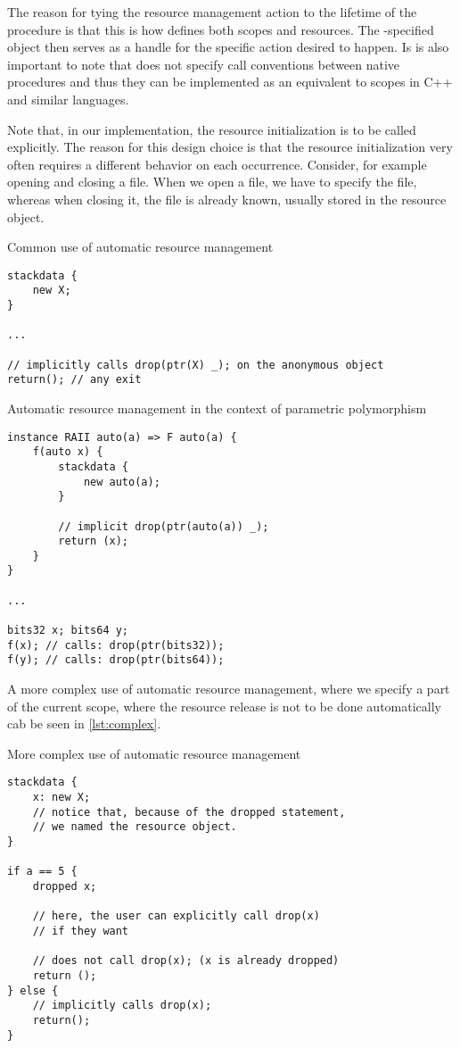 The reason for tying the resource management action to the lifetime of the procedure is that this is how \cmm defines both scopes and resources. The -specified object then serves as a handle for the specific action desired to happen. Is is also important to note that \cmm does not specify call conventions between native \cmm procedures and thus they can be implemented as an equivalent to scopes in C++ and similar languages.

Note that, in our implementation, the resource initialization is to be called explicitly. The reason for this design choice is that the resource initialization very often requires a different behavior on each occurrence. Consider, for example opening and closing a file. When we open a file, we have to specify the file, whereas when closing it, the file is already known, usually stored in the resource object.

\begin{listing}
    \caption{Common use of automatic resource management}
    \label{lst:commonResource}
    \begin{lstlisting}
stackdata {
    new X;
}

...

// implicitly calls drop(ptr(X) _); on the anonymous object
return(); // any exit
    \end{lstlisting}
\end{listing}

\begin{listing}
    \caption{Automatic resource management in the context of parametric polymorphism}
    \label{lst:polyResourceEx}
    \begin{lstlisting}
instance RAII auto(a) => F auto(a) {
    f(auto x) {
        stackdata {
            new auto(a);
        }

        // implicit drop(ptr(auto(a)) _);
        return (x);
    }
}

...

bits32 x; bits64 y;
f(x); // calls: drop(ptr(bits32));
f(y); // calls: drop(ptr(bits64));
    \end{lstlisting}
\end{listing}

A more complex use of automatic resource management, where we specify a part of the current scope, where the resource release is not to be done automatically cab be seen in \cref{lst:complex}.


\begin{listing}
    \caption{More complex use of automatic resource management}
    \label{lst:complex}
    \begin{lstlisting}
stackdata {
    x: new X;
    // notice that, because of the dropped statement,
    // we named the resource object.
}

if a == 5 {
    dropped x;

    // here, the user can explicitly call drop(x)
    // if they want

    // does not call drop(x); (x is already dropped)
    return ();
} else {
    // implicitly calls drop(x);
    return();
}
    \end{lstlisting}
\end{listing}

